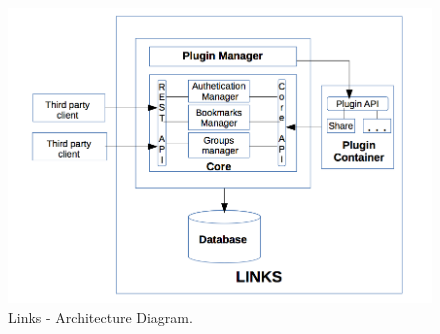 \documentclass[11pt]{report} %
\begin{document}
\begin{figure}[h]
\centering
        \includegraphics[width=\textwidth]{architecture-diagram}
    \caption{{Links - Architecture Diagram}.}
    \label{fig:Architecture Diagram}
\end{figure}
\end{document}
